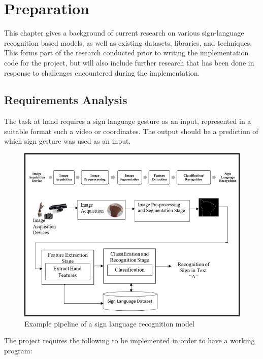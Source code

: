 \documentclass[final,rdr32.tex]{subfiles}
\begin{document}
\chapter{Preparation}

This chapter gives a background of current research on various sign-language recognition based models, as well as existing datasets, libraries, and techniques. This forms part of the research conducted prior to writing the implementation code for the project, but will also include further research that has been done in response to challenges encountered during the implementation.

\section{Requirements Analysis}

The task at hand requires a sign language gesture as an input, represented in a suitable format such a video or coordinates. The output should be a prediction of which sign gesture was used as an input.

\begin{figure}[H]
    \begin{center}
        \includegraphics[scale=0.85]{images/task.jpg}
        \caption[caption]{Example pipeline of a sign language recognition model}
    \end{center}
\end{figure}


The project requires the following to be implemented in order to have a working program:
\end{document}
